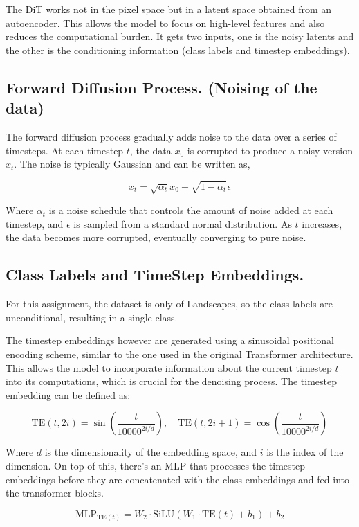 \documentclass[10pt]{article}
\theoremstyle{plain}
\begin{document}
The DiT works not in the pixel space but in a latent space obtained from an autoencoder. This allows the model to focus on high-level features and also reduces the computational burden. It gets two inputs, one is the noisy latents and the other is the conditioning information (class labels and timestep embeddings). 

\subsection{Forward Diffusion Process. (Noising of the data)}

The forward diffusion process gradually adds noise to the data over a series of timesteps. At each timestep \(t\), the data \(x_0\) is corrupted to produce a noisy version \(x_t\). The noise is typically Gaussian and can be written as,

\[
    x_t = \sqrt{\alpha_t} x_0 + \sqrt{1 - \alpha_t} \epsilon
\]

Where \(\alpha_t\) is a noise schedule that controls the amount of noise added at each timestep, and \(\epsilon\) is sampled from a standard normal distribution. As \(t\) increases, the data becomes more corrupted, eventually converging to pure noise.

\subsection{Class Labels and TimeStep Embeddings.}

For this assignment, the dataset is only of Landscapes, so the class labels are unconditional, resulting in a single class. 

The timestep embeddings however are generated using a sinusoidal positional encoding scheme, similar to the one used in the original Transformer architecture. This allows the model to incorporate information about the current timestep \(t\) into its computations, which is crucial for the denoising process. The timestep embedding can be defined as:

\[
    \text{TE}(t, 2i) = \sin\left(\frac{t}{10000^{2i/d}}\right), \quad
    \text{TE}(t, 2i+1) = \cos\left(\frac{t}{10000^{2i/d}}\right)
\]

Where \(d\) is the dimensionality of the embedding space, and \(i\) is the index of the dimension. On top of this, there's an MLP that processes the timestep embeddings before they are concatenated with the class embeddings and fed into the transformer blocks. 

\[
    \text{MLP}_{\text{TE}(t)} = W_2 \cdot \mathrm{SiLU}(W_1 \cdot \text{TE}(t) + b_1) + b_2  
\]
\end{document}
